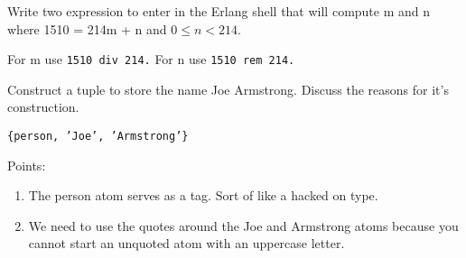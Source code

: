\begin{questions}

    \question[3] Write two expression to enter in the Erlang shell that
    will compute m and n where 1510 = 214m + n and $0 \le n < 214$.
    \begin{solution}
        For m use {\tt 1510 div 214.} For n use {\tt 1510 rem 214.}
    \end{solution}

    \question[4] Construct a tuple to store the name Joe
    Armstrong. Discuss the reasons for it's construction.
    \begin{solution}        
        {\tt \{person, 'Joe', 'Armstrong'\} }
        
        Points:
        \begin{enumerate}
        \item The person atom serves as a tag. Sort of like a hacked
        on type.
        \item We need to use the quotes around the Joe and Armstrong
        atoms because you cannot start an unquoted atom with an
        uppercase letter.
        \end{enumerate}
        

\end{solution}
\end{questions}
